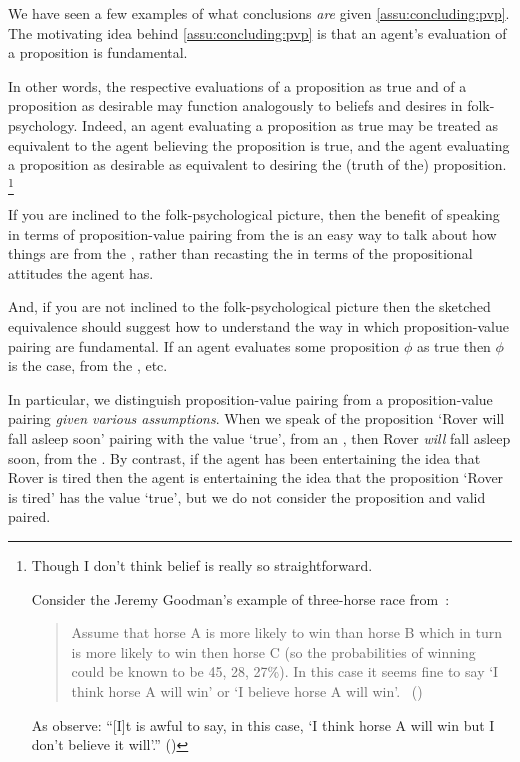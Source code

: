 \begin{note}
  We have seen a few examples of what conclusions \emph{are} given \autoref{assu:concluding:pvp}.
  The motivating idea behind \autoref{assu:concluding:pvp} is that an agent's evaluation of a proposition is fundamental.

  In other words, the respective evaluations of a proposition as true and of a proposition as desirable may function analogously to beliefs and desires in folk-psychology.
  Indeed, an agent evaluating a proposition as true may be treated as equivalent to the agent believing the proposition is true, and the agent evaluating a proposition as desirable as equivalent to desiring the (truth of the) proposition.%
  \footnote{
    \label{fn:belief-is-difficult}
    Though I don't think belief is really so straightforward.

    Consider the Jeremy Goodman's example of three-horse race from~\textcite{Hawthorne:2016wv}:
    \begin{quote}
      Assume that horse A is more likely to win than horse B which in turn is more likely to win then horse C (so the probabilities of winning could be known to be 45, 28, 27\%).
      In this case it seems ﬁne to say `I think horse A will win' or `I believe horse A will win'.%
      \mbox{ }\hfill\mbox{(\citeyear[1440]{Hawthorne:2016wv})}
    \end{quote}
    As \citeauthor{Hawthorne:2016wv} observe: ``[I]t is awful to say, in this case, `I think horse A will win but I don't believe it will'.''
    (\citeyear[1440, fn.17]{Hawthorne:2016wv})
  }

  If you are inclined to the folk-psychological picture, then the benefit of speaking in terms of proposition-value pairing from the \agpe{} is an easy way to talk about how things are from the \agpe{}, rather than recasting the \agpe{} in terms of the propositional attitudes the agent has.

  And, if you are not inclined to the folk-psychological picture then the sketched equivalence should suggest how to understand the way in which proposition-value pairing are fundamental.
  If an agent evaluates some proposition \(\phi\) as true then \(\phi\) is the case, from the \agpe{}, etc.
\end{note}

\begin{note}
  In particular, we distinguish proposition-value pairing from a proposition-value pairing \emph{given various assumptions}.
  When we speak of the proposition `Rover will fall asleep soon' pairing with the value `true', from an \agpe{}, then Rover \emph{will} fall asleep soon, from the \agpe{}.
  By contrast, if the agent has been entertaining the idea that Rover is tired then the agent is entertaining the idea that the proposition `Rover is tired' has the value `true', but we do not consider the proposition and valid paired.
\end{note}

